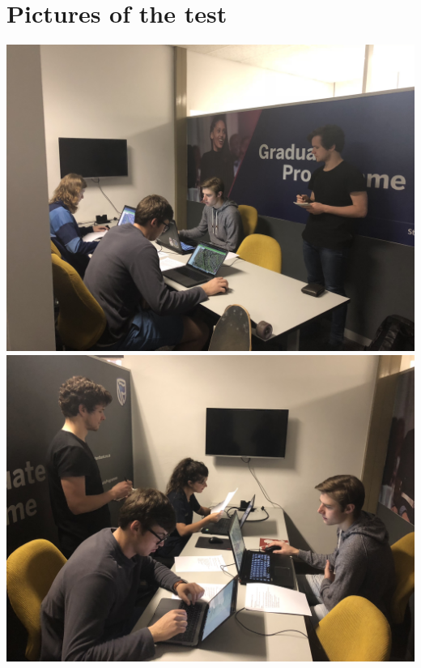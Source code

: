 \documentclass{article}
\begin{document}
	  \section{Pictures of the test}
	  \includegraphics[scale=0.1]{img}
	  \includegraphics[scale=0.1]{img2}
	
\end{document}
